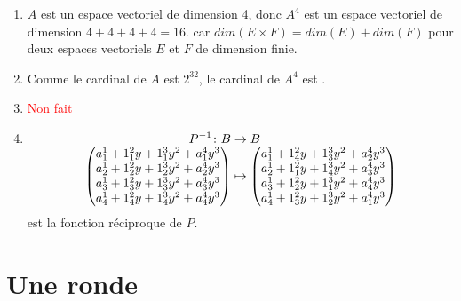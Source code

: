 \documentclass[a4paper, 12pt]{article}
\begin{document}
\begin{enumerate}[label=\textbf{Question \arabic*.}, leftmargin=*]

    \item $A$ est un espace vectoriel de dimension 4, donc $A^4$ est un espace vectoriel de dimension $4 + 4 + 4 + 4 = 16$.
car $dim(E \times F) = dim(E) + dim(F)$ pour deux espaces vectoriels $E$ et $F$ de dimension finie.

    \item Comme le cardinal de $A$ est $2^{32}$, le cardinal de $A^4$ est .

    \item \textcolor{red}{Non fait}

    \item\label{q:34}

$$\funcdef{P^{-1}}{B}{B}{\begin{pmatrix}
    a_1^1 + 1_1^2y + 1_1^3y^2 + a_1^4y^3 \\
    a_2^1 + 1_2^2y + 1_2^3y^2 + a_2^4y^3 \\
    a_3^1 + 1_3^2y + 1_3^3y^2 + a_3^4y^3 \\
    a_4^1 + 1_4^2y + 1_4^3y^2 + a_4^4y^3
\end{pmatrix}}{\begin{pmatrix}
    a_1^1 + 1_4^2y + 1_3^3y^2 + a_2^4y^3 \\
    a_2^1 + 1_1^2y + 1_4^3y^2 + a_3^4y^3 \\
    a_3^1 + 1_2^2y + 1_1^3y^2 + a_4^4y^3 \\
    a_4^1 + 1_3^2y + 1_2^3y^2 + a_1^4y^3
\end{pmatrix}}$$
est la fonction réciproque de $P$.
\end{enumerate}
\section{Une ronde}
\end{document}
